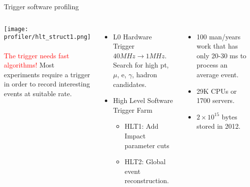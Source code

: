 \begin{frame}{Trigger software profiling}
\begin{columns}[c]
\texttt{[image: profiler/hlt\_struct1.png]}\\~\\
\textcolor{red}{The trigger needs fast algorithms!}
Most experiments require a trigger in order to record interesting events at suitable rate.
\begin{itemize}
  \item L0 Hardware Trigger $40 MHz \rightarrow 1 MHz$. Search for high pt, $\mu$, e, $\gamma$, hadron candidates.
  \item High Level Software Trigger Farm
  \begin{itemize}
    \item HLT1: Add Impact parameter cuts
    \item HLT2: Global event reconstruction.
  \end{itemize}
\end{itemize}
\begin{itemize}
  \item 100 man/years work that has only 20-30 ms to process an average event.
  \item 29K CPUs or 1700 servers.
  \item $2 \times 10^{15}$ bytes stored in 2012.
\end{itemize}
\end{columns}
\end{frame}
